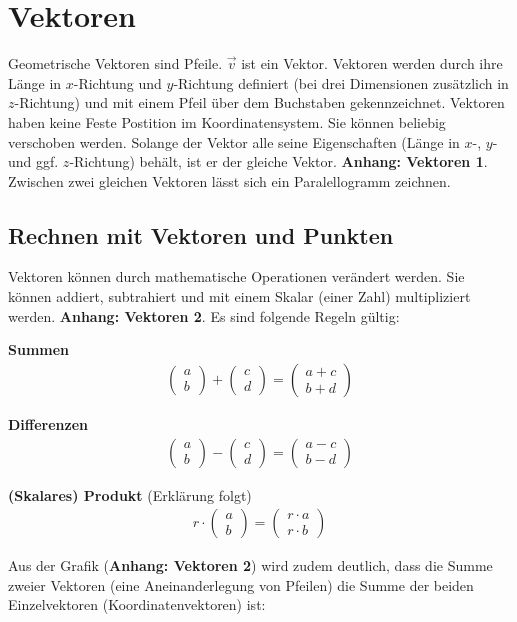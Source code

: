 \documentclass{article}
\newcommand{\m}[1]{\begin{pmatrix}#1\end{pmatrix}}
\begin{document}
    \section{Vektoren}

    Geometrische Vektoren sind Pfeile. $\vec{v}$ ist ein Vektor.
    Vektoren werden durch ihre Länge in $x$-Richtung und $y$-Richtung definiert
    (bei drei Dimensionen zusätzlich in $z$-Richtung) und mit einem Pfeil über dem Buchstaben gekennzeichnet.
    Vektoren haben keine Feste Postition im Koordinatensystem. Sie können beliebig verschoben werden.
    Solange der Vektor alle seine Eigenschaften (Länge in $x$-, $y$- und ggf. $z$-Richtung) behält,
    ist er der gleiche Vektor. \textbf{Anhang: Vektoren 1}. Zwischen zwei gleichen Vektoren lässt sich ein
    Paralellogramm zeichnen.
    

    \subsection{Rechnen mit Vektoren und Punkten}
    Vektoren können durch mathematische Operationen verändert werden. 
    Sie können addiert, subtrahiert und mit einem Skalar (einer Zahl) multipliziert werden.
    \textbf{Anhang: Vektoren 2}.
    Es sind folgende Regeln gültig:


    \textbf{Summen}
    \[
        \begin{split}
            \m{a \\ b} + \m{c \\ d} = \m{a+c \\ b+d}
        \end{split}
    \]

    \textbf{Differenzen}
    \[
        \begin{split}
            \m{a \\ b} - \m{c \\ d} = \m{a-c \\ b-d}
        \end{split}
    \]

    \textbf{(Skalares) Produkt} (Erklärung folgt)
    \[
        \begin{split}
            r \cdot \m{a \\ b} = \m{r \cdot a \\ r \cdot b}
        \end{split}
    \]

    Aus der Grafik (\textbf{Anhang: Vektoren 2}) wird zudem deutlich, dass die Summe zweier Vektoren (eine Aneinanderlegung von Pfeilen)
    die Summe der beiden Einzelvektoren (Koordinatenvektoren) ist:
\end{document}
